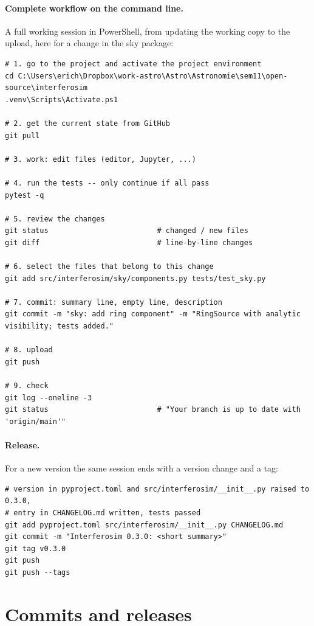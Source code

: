 \paragraph*{Complete workflow on the command line.} A full working
session in PowerShell, from updating the working copy to the upload, here
for a change in the sky package:
\begin{lstlisting}[basicstyle=\ttfamily\footnotesize, frame=single]
# 1. go to the project and activate the project environment
cd C:\Users\erich\Dropbox\work-astro\Astro\Astronomie\sem11\open-source\interferosim
.venv\Scripts\Activate.ps1

# 2. get the current state from GitHub
git pull

# 3. work: edit files (editor, Jupyter, ...)

# 4. run the tests -- only continue if all pass
pytest -q

# 5. review the changes
git status                         # changed / new files
git diff                           # line-by-line changes

# 6. select the files that belong to this change
git add src/interferosim/sky/components.py tests/test_sky.py

# 7. commit: summary line, empty line, description
git commit -m "sky: add ring component" -m "RingSource with analytic visibility; tests added."

# 8. upload
git push

# 9. check
git log --oneline -3
git status                         # "Your branch is up to date with 'origin/main'"
\end{lstlisting}

\paragraph*{Release.} For a new version the same session ends with a
version change and a tag:
\begin{lstlisting}[basicstyle=\ttfamily\footnotesize, frame=single]
# version in pyproject.toml and src/interferosim/__init__.py raised to 0.3.0,
# entry in CHANGELOG.md written, tests passed
git add pyproject.toml src/interferosim/__init__.py CHANGELOG.md
git commit -m "Interferosim 0.3.0: <short summary>"
git tag v0.3.0
git push
git push --tags
\end{lstlisting}

\section{Commits and releases}

